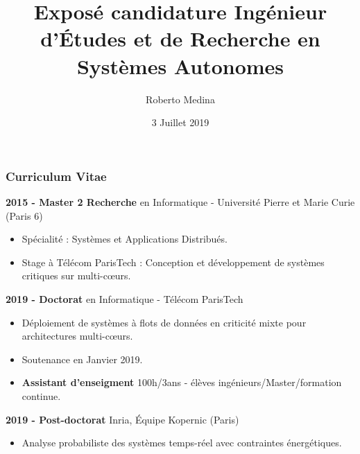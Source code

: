 \documentclass[xcolor=table]{beamer}
\title[]{Exposé candidature 
Ingénieur d'Études et de Recherche en Systèmes Autonomes} %
\author{Roberto Medina} %
\institute[Inria] %
{
Post-doctorant dans l'équipe Kopernic, Inria\\
Docteur en informatique de Télécom ParisTech\\
\medskip
\textit{roberto.medina-bonilla@inria.fr} %
}
\date{3 Juillet 2019} %
\begin{document}
\begin{frame}
\titlepage %
\end{frame}


\begin{frame}
	\frametitle{Curriculum Vitae}
	\textbf{2015 - Master 2 Recherche} en Informatique - 
			Université Pierre et Marie Curie (Paris 6)
		\begin{itemize}
			\item Spécialité : Systèmes et Applications Distribués.
			\item Stage à Télécom ParisTech : Conception et développement de 
			systèmes critiques sur multi-c\oe{}urs.
		\end{itemize}
	
	\textbf{2019 - Doctorat} en Informatique - Télécom ParisTech
		\begin{itemize}
			\item Déploiement de systèmes à flots de données en criticité mixte 
			pour architectures multi-c\oe{}urs.
			\item Soutenance en Janvier 2019.
			\item \textbf{Assistant d'enseigment} 100h/3ans - élèves 
			ingénieurs/Master/formation continue.
		\end{itemize}
	\textbf{2019 - Post-doctorat} Inria, Équipe Kopernic (Paris)
		\begin{itemize}
			\item Analyse probabiliste des systèmes temps-réel avec contraintes 
			énergétiques.
		\end{itemize}
\end{frame}

\end{document}
